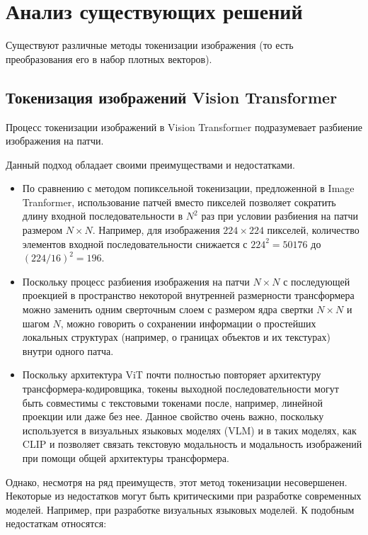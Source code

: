 \documentclass[times,specification,annotation]{itmo-student-thesis}
\begin{document}
\chapter{Анализ существующих решений}
Существуют различные методы токенизации изображения (то есть преобразования его в набор плотных векторов).

\section{Токенизация изображений Vision Transformer}
Процесс токенизации изображений в Vision Transformer подразумевает разбиение изображения на патчи.

Данный подход обладает своими преимуществами и недостатками.

\begin{itemize}
    \item По сравнению с методом попиксельной токенизации, предложенной в Image Tranformer, использование патчей вместо пикселей позволяет сократить длину входной последовательности в $N^2$ раз при условии разбиения на патчи размером $N \times N$. Например, для изображения $224 \times 224$ пикселей, количество элементов входной последовательности снижается с $224^2 = 50 176$ до $(224 / 16)^2 = 196$.
    \item Поскольку процесс разбиения изображения на патчи $N \times N$ с последующей проекцией в пространство некоторой внутренней размерности трансформера можно заменить одним сверточным слоем с размером ядра свертки $N \times N$ и шагом $N$, можно говорить о сохранении информации о простейших локальных структурах (например, о границах объектов и их текстурах) внутри одного патча.
    \item Поскольку архитектура ViT почти полностью повторяет архитектуру трансформера-кодировщика, токены выходной последовательности могут быть совместимы с текстовыми токенами после, например, линейной проекции или даже без нее. Данное свойство очень важно, поскольку используется в визуальных языковых моделях (VLM)\cite{llava} и в таких моделях, как CLIP\cite{clip} и позволяет связать текстовую модальность и модальность изображений при помощи общей архитектуры трансформера.
\end{itemize}

Однако, несмотря на ряд преимуществ, этот метод токенизации несовершенен. Некоторые из недостатков могут быть критическими при разработке современных моделей. Например, при разработке визуальных языковых моделей. К подобным недостаткам относятся:
\end{document}
